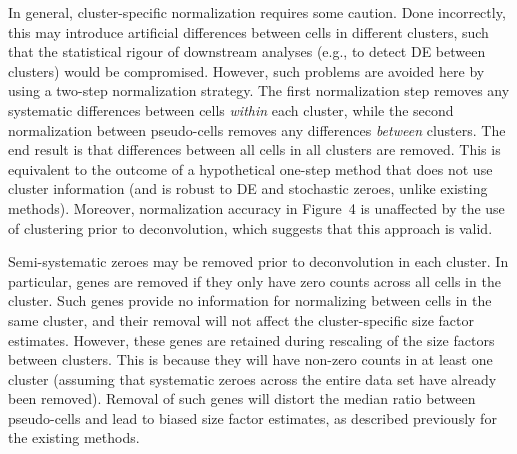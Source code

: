 \documentclass{article}
\newcommand{\figdeconv}{4}
\begin{document}
In general, cluster-specific normalization requires some caution.
Done incorrectly, this may introduce artificial differences between cells in different clusters, 
    such that the statistical rigour of downstream analyses (e.g., to detect DE between clusters) would be compromised.
However, such problems are avoided here by using a two-step normalization strategy.
The first normalization step removes any systematic differences between cells \textit{within} each cluster, 
    while the second normalization between pseudo-cells removes any differences \textit{between} clusters.
The end result is that differences between all cells in all clusters are removed.
This is equivalent to the outcome of a hypothetical one-step method that does not use cluster information (and is robust to DE and stochastic zeroes, unlike existing methods).
Moreover, normalization accuracy in Figure~\figdeconv{} is unaffected by the use of clustering prior to deconvolution, which suggests that this approach is valid.

Semi-systematic zeroes may be removed prior to deconvolution in each cluster.
In particular, genes are removed if they only have zero counts across all cells in the cluster.
Such genes provide no information for normalizing between cells in the same cluster, and their removal will not affect the cluster-specific size factor estimates.
However, these genes are retained during rescaling of the size factors between clusters.
This is because they will have non-zero counts in at least one cluster (assuming that systematic zeroes across the entire data set have already been removed).
Removal of such genes will distort the median ratio between pseudo-cells and lead to biased size factor estimates, as described previously for the existing methods.
\end{document}
